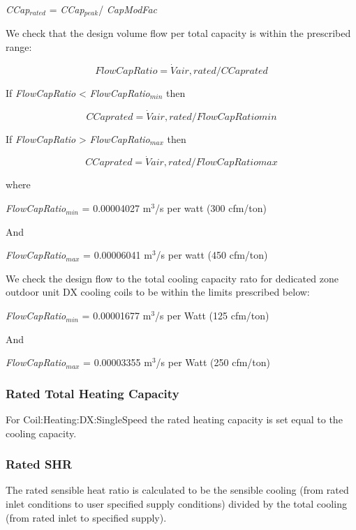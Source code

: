 \emph{CCap\(_{rated}\)} = \emph{CCap\(_{peak}\)}/ \emph{CapModFac}

We check that the design volume flow per total capacity is within the prescribed range:

\begin{equation}
FlowCapRatio = \dot Vair,rated/CCaprated
\end{equation}

If \emph{FlowCapRatio} \textless{} \emph{FlowCapRatio\(_{min}\)} then

\begin{equation}
CCaprated = \dot Vair,rated/FlowCapRatiomin
\end{equation}

If \emph{FlowCapRatio} \textgreater{} \emph{FlowCapRatio\(_{max}\)} then

\begin{equation}
CCaprated = \dot Vair,rated/FlowCapRatiomax
\end{equation}

where

\emph{FlowCapRatio\(_{min}\)} = 0.00004027 m\(^{3}\)/s per watt (300 cfm/ton)

And

\emph{FlowCapRatio\(_{max}\)} = 0.00006041 m\(^{3}\)/s per watt (450 cfm/ton)

We check the design flow to the total cooling capacity rato for dedicated zone outdoor unit DX cooling coils to be within the limits prescribed below:

\emph{FlowCapRatio\(_{min}\)} = 0.00001677 m\(^{3}\)/s per Watt (125 cfm/ton)

And

\emph{FlowCapRatio\(_{max}\)} = 0.00003355 m\(^{3}\)/s per Watt (250 cfm/ton)

\subsubsection{Rated Total Heating Capacity}\label{rated-total-heating-capacity-2}

For Coil:Heating:DX:SingleSpeed the rated heating capacity is set equal to the cooling capacity.

\subsubsection{Rated SHR}\label{rated-shr}

The rated sensible heat ratio is calculated to be the sensible cooling (from rated inlet conditions to user specified supply conditions) divided by the total cooling (from rated inlet to specified supply).

